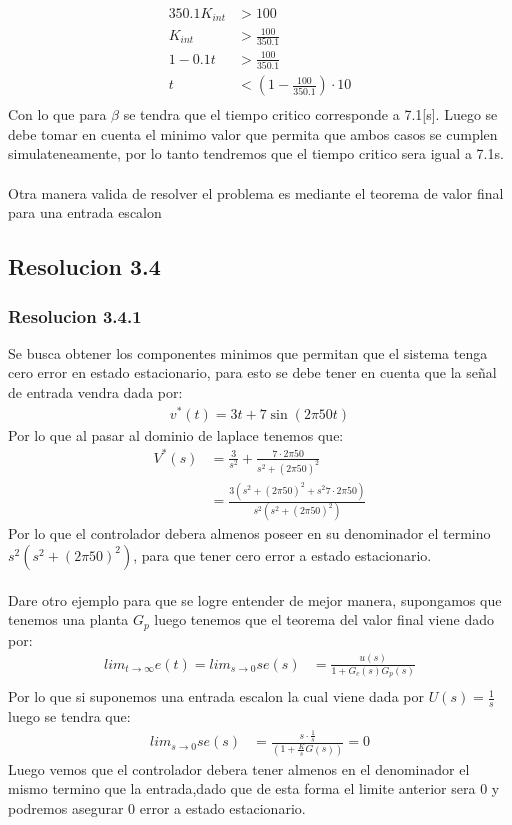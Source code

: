 \documentclass[
  11pt,
  letterpaper,
   addpoints,
   answers
  ]{exam}
\begin{document}
\begin{questions}
\begin{solution}
\begin{align}
    350.1K_{int} &> 100\\
    K_{int} &> \frac{100}{350.1}\\
    1-0.1t &> \frac{100}{350.1}\\
    t& < \left(1- \frac{100}{350.1}\right)\cdot 10\\
\end{align}
Con lo que para $\beta$ se tendra que el tiempo critico corresponde a 7.1[s]. Luego se debe tomar en cuenta el minimo valor que permita que ambos casos se cumplen simulateneamente, por lo tanto tendremos que el tiempo critico sera igual a 7.1s.\\\\
Otra manera valida de resolver el problema es mediante el teorema de valor final para una entrada escalon
\subsection*{Resolucion 3.4}
\subsubsection*{Resolucion 3.4.1}
Se busca obtener los componentes minimos que permitan que el sistema tenga cero error en estado estacionario, para esto se debe tener en cuenta que la señal de entrada vendra dada por:
\begin{align}
    v^{*}(t) = 3t + 7\sin(2\pi 50t)
\end{align}
Por lo que al pasar al dominio de laplace tenemos que:
\begin{align}
    V^{*}(s) &= \frac{3}{s^{2}} + \frac{7\cdot 2\pi 50}{s^{2} + (2\pi 50)^{2}}\\
             &= \frac{3(s^{2} +(2\pi50)^{2} + s^{2} 7 \cdot 2 \pi 50) }{s^{2}( s^{2} + (2\pi 50)^{2})}
\end{align}
Por lo que el controlador debera almenos poseer en su denominador el termino $s^{2}( s^{2} + (2\pi 50)^{2})$, para que tener cero error a estado estacionario.\\\\
Dare otro ejemplo para que se logre entender de mejor manera, supongamos que tenemos una planta $G_{p}$ luego tenemos que el teorema del valor final viene dado por:
\begin{align}
    lim_{t\to \infty} e(t) = lim_{s\to 0} se(s) &= \frac{u(s)}{1+G_{c}(s)G_{p}(s)}\\
\end{align}
Por lo que si suponemos una entrada escalon la cual viene dada por $U(s)= \frac{1}{s}$ luego se tendra que:
\begin{align}
    lim_{s\to 0} se(s) &= \frac{s \cdot \frac{1}{s}}{(1+ \frac{K}{s}G(s))}= 0
\end{align}
Luego vemos que el controlador debera tener almenos en el denominador el mismo termino que la entrada,dado que de esta forma el limite anterior sera 0 y podremos asegurar 0 error a estado estacionario.

\end{solution}
\end{questions}
\end{document}
